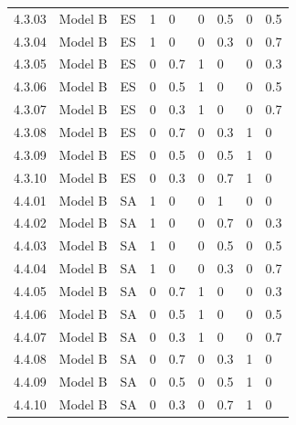 \begin{table}[!t]
\begin{tabular}{@{}lllllllll@{}}
    4.3.03 & Model B & ES & 1 & 0 & 0 & 0.5 & 0 & 0.5 \\
    4.3.04 & Model B & ES & 1 & 0 & 0 & 0.3 & 0 & 0.7 \\
    4.3.05 & Model B & ES & 0 & 0.7 & 1 & 0 & 0 & 0.3 \\
    4.3.06 & Model B & ES & 0 & 0.5 & 1 & 0 & 0 & 0.5 \\
    4.3.07 & Model B & ES & 0 & 0.3 & 1 & 0 & 0 & 0.7 \\
    4.3.08 & Model B & ES & 0 & 0.7 & 0 & 0.3 & 1 & 0 \\
    4.3.09 & Model B & ES & 0 & 0.5 & 0 & 0.5 & 1 & 0 \\
    4.3.10 & Model B & ES & 0 & 0.3 & 0 & 0.7 & 1 & 0 \\
    \noalign{\smallskip}
    4.4.01 & Model B & SA & 1 & 0 & 0 & 1 & 0 & 0 \\
    4.4.02 & Model B & SA & 1 & 0 & 0 & 0.7 & 0 & 0.3 \\
    4.4.03 & Model B & SA & 1 & 0 & 0 & 0.5 & 0 & 0.5 \\
    4.4.04 & Model B & SA & 1 & 0 & 0 & 0.3 & 0 & 0.7 \\
    4.4.05 & Model B & SA & 0 & 0.7 & 1 & 0 & 0 & 0.3 \\
    4.4.06 & Model B & SA & 0 & 0.5 & 1 & 0 & 0 & 0.5 \\
    4.4.07 & Model B & SA & 0 & 0.3 & 1 & 0 & 0 & 0.7 \\
    4.4.08 & Model B & SA & 0 & 0.7 & 0 & 0.3 & 1 & 0 \\
    4.4.09 & Model B & SA & 0 & 0.5 & 0 & 0.5 & 1 & 0 \\
    4.4.10 & Model B & SA & 0 & 0.3 & 0 & 0.7 & 1 & 0 \\
\hline
\end{tabular}
\end{table}